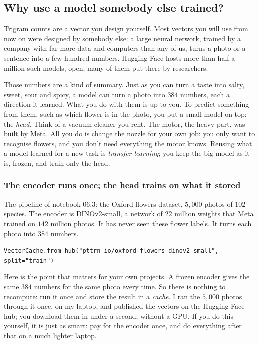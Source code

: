 \documentclass[12pt, a4paper]{article}
\theoremstyle{definition}
\theoremstyle{remark}
\begin{document}
\subsection{Why use a model somebody else trained?}
\label{sec:pretrained}
Trigram counts are a vector you design yourself. Most vectors you will use from now on were designed by somebody else: a large neural network, trained by a company with far more data and computers than any of us, turns a photo or a sentence into a few hundred numbers. Hugging Face hosts more than half a million such models, open, many of them put there by researchers.

Those numbers are a kind of summary. Just as you can turn a taste into salty, sweet, sour and spicy, a model can turn a photo into $384$ numbers, each a direction it learned. What you do with them is up to you. To predict something from them, such as which flower is in the photo, you put a small model on top: the \emph{head}. Think of a vacuum cleaner you rent. The motor, the heavy part, was built by Meta. All you do is change the nozzle for your own job: you only want to recognise flowers, and you don't need everything the motor knows. Reusing what a model learned for a new task is \emph{transfer learning}; you keep the big model as it is, frozen, and train only the head.

\subsubsection{The encoder runs once; the head trains on what it stored}
The pipeline of notebook 06.3: the Oxford flowers dataset, $5{,}000$ photos of $102$ species. The encoder is DINOv2-small, a network of $22$ million weights that Meta trained on $142$ million photos. It has never seen these flower labels. It turns each photo into $384$ numbers.

\begin{center}
\texttt{VectorCache.from\_hub("pttrn-io/oxford-flowers-dinov2-small", split="train")}
\end{center}

Here is the point that matters for your own projects. A frozen encoder gives the same $384$ numbers for the same photo every time. So there is nothing to recompute: run it once and store the result in a \emph{cache}. I ran the $5{,}000$ photos through it once, on my laptop, and published the vectors on the Hugging Face hub; you download them in under a second, without a GPU. If you do this yourself, it is just as smart: pay for the encoder once, and do everything after that on a much lighter laptop.
\end{document}
